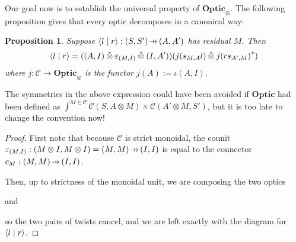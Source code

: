 \documentclass[11pt,letterpaper]{article}
\theoremstyle{plain}
\newtheorem{proposition}[theorem]{Proposition}
\theoremstyle{definition}
\newcommand{\C}{\mathscr{C}}
\newcommand{\Optic}{\mathbf{Optic}}
\newcommand{\switched}{\mathbin{\tilde{\otimes}}}
\newcommand{\rep}[2]{{\ensuremath \left\langle #1 \mid #2 \right\rangle}}
\newcommand{\hto}{\ensuremath{\,\mathaccent\shortmid\rightarrow\,}}
\begin{document}
Our goal now is to establish the universal property of $\Optic_\otimes$. The following proposition gives that every optic decomposes in a canonical way:

\begin{proposition}\label{prop:optic-decompose}
  Suppose $\rep{l}{r} : (S, S') \hto (A, A')$ has residual $M$. Then
  \begin{align*}
    \rep{l}{r} = ((A, I) \switched \varepsilon_{(M, I)} \switched (I, A'))(j(s_{M,A}l) \switched j{(rs_{A',M})}^*)
  \end{align*}
  where $j : \C \to \Optic_\otimes$ is the functor $j(A) := \iota(A, I)$.
\end{proposition}
The symmetries in the above expression could have been avoided if $\Optic$ had been defined as $\int^{M \in \C} \C(S, A \otimes M) \times \C(A' \otimes M, S')$, but it is too late to change the convention now!
\begin{proof}
  First note that because $\C$ is strict monoidal, the counit $\varepsilon_{(M, I)} : (M \otimes I, M \otimes I) = (M, M) \hto (I, I)$ is equal to the connector $c_M : (M, M) \hto (I, I)$.

  Then, up to strictness of the monoidal unit, we are composing the two optics
  \begin{center}
    
  \end{center}
  and
  \begin{center}
    
  \end{center}
  so the two pairs of twists cancel, and we are left exactly with the diagram for $\rep{l}{r}$.
\end{proof}
\end{document}
